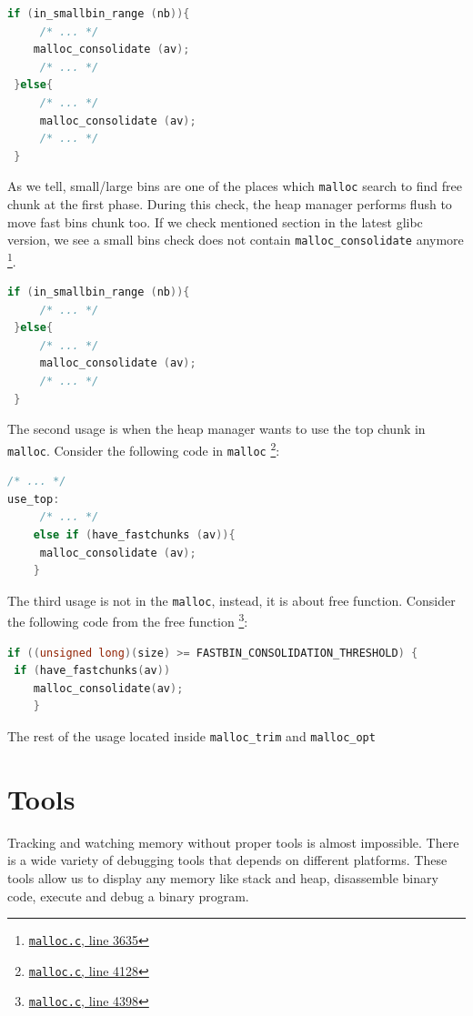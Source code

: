 \documentclass{masterthesis}
\newcommand*\libc{glibc}
\newcommand*\fb{fast bins}
\newcommand*\lb{large bins}
\newcommand*\sbs{small bins}
\newcommand*\mallocc{\lstinline{malloc}}
\begin{document}
\begin{lstlisting}[language=c,frame=tlrb]
 if (in_smallbin_range (nb)){
	 /* ... */
 	malloc_consolidate (av);
	 /* ... */
 }else{
	 /* ... */
	 malloc_consolidate (av);
	 /* ... */
 }
\end{lstlisting}

As we tell, small/\lb{} are one of the places which \mallocc{} search to find free chunk at the first phase. During this check, the heap manager performs flush to move \fb{} chunk too. If we check mentioned section in the latest \libc{} version, we see a \sbs{} check does not contain \lstinline{malloc_consolidate} anymore \footnote{\href{https://sourceware.org/git/?p=glibc.git;a=blob;f=malloc/malloc.c;h=f7cd29bc2f93e1082ee77800bd64a4b2a2897055;hb=9ea3686266dca3f004ba874745a4087a89682617\#l3635}{\texttt{malloc.c}, line 3635}}.

\begin{lstlisting}[language=c,frame=tlrb]
 if (in_smallbin_range (nb)){
 	 /* ... */
 }else{
	 /* ... */
	 malloc_consolidate (av);
	 /* ... */
 }
\end{lstlisting}

The second usage is when the heap manager wants to use the top chunk in \mallocc{}. Consider the following code in \mallocc{} \footnote{\href{https://sourceware.org/git/?p=glibc.git;a=blob;f=malloc/malloc.c;h=f7cd29bc2f93e1082ee77800bd64a4b2a2897055;hb=9ea3686266dca3f004ba874745a4087a89682617\#l4128}{\texttt{malloc.c}, line 4128}}:

\begin{lstlisting}[language=c,frame=tlrb]
 /* ... */
use_top:
	 /* ... */
	else if (have_fastchunks (av)){
	 malloc_consolidate (av);
	}
\end{lstlisting}

The third usage is not in the \mallocc{}, instead, it is about free function. Consider the following code from the free function \footnote{\href{https://sourceware.org/git/?p=glibc.git;a=blob;f=malloc/malloc.c;h=f7cd29bc2f93e1082ee77800bd64a4b2a2897055;hb=9ea3686266dca3f004ba874745a4087a89682617\#l4398}{\texttt{malloc.c}, line 4398}}:

\begin{lstlisting}[language=c,frame=tlrb]
if ((unsigned long)(size) >= FASTBIN_CONSOLIDATION_THRESHOLD) {
 if (have_fastchunks(av))
	malloc_consolidate(av);
	}
\end{lstlisting}

The rest of the usage located inside \lstinline{malloc_trim} and \lstinline{malloc_opt}
\chapter{Tools }
Tracking and watching memory without proper tools is almost impossible. There is a wide variety of debugging tools that depends on different platforms. These tools allow us to display any memory like stack and heap, disassemble binary code, execute and debug a binary program.
\end{document}
